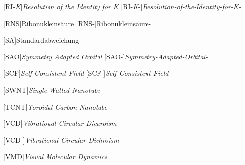 \begin{acronym}[D-COSMO-RS]
    [RI-\textit{K}]{\textit{Resolution of the Identity for K}}
    [RI-\textit{K}-]{\textit{Resolution-of-the-Identity-for-K-}}
    
    [RNS]{Ribonukleinsäure}
    [RNS-]{Ribonukleinsäure-}
    
    [SA]{Standardabweichung}
    
    [SAO]{\textit{Symmetry Adapted Orbital}}
    [SAO-]{\textit{Symmetry-Adapted-Orbital-}}
    
	[SCF]{\textit{Self Consistent Field}} 
	[SCF-]{\textit{Self-Consistent-Field-}} 
	
	[SWNT]{\textit{Single-Walled Nanotube}}
		
	[TCNT]{\textit{Toroidal Carbon Nanotube}} 
		
	[VCD]{\textit{Vibrational Circular Dichroism}}
	
	[VCD-]{\textit{Vibrational-Circular-Dichroism-}}
     
    [VMD]{\textit{Visual Molecular Dynamics}}
\end{acronym}